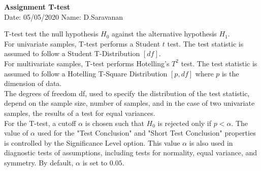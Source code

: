\documentclass[a4paper,11pt,openright]{report}
\begin{document}
\singlespacing
\pagestyle{plain}

\begin{center}
\textbf{Assignment T-test} \\
Date: 05/05/2020 \hspace{2mm} Name: D.Saravanan
\end{center}

\vspace{10px}

T-test test the null hypothesis $H_{0}$ against the alternative hypothesis $H_{1}$. \\

For univariate samples, T-test performs a Student $t$ test. The test statistic is assumed to
follow a Student T-Distribution $[df]$. \\ 

For multivariate samples, T-test performs Hotelling's $T^{2}$ test. The test statistic is
assumed to follow a Hotelling T-Square Distribution $[p,df]$ where $p$ is the dimension of
data. \\

The degrees of freedom df, used to specify the distribution of the test statistic, depend on
the sample size, number of samples, and in the case of two univariate samples, the results 
of a test for equal variances. \\ 

For the T-test, a cutoff $\alpha$ is chosen such that $H_{0}$ is rejected only if $p < 
\alpha$. The value of $\alpha$ used for the "Test Conclusion" and "Short Test Conclusion"
properties is controlled by the Significance Level option. This value $\alpha$ is also used
in diagnostic tests of assumptions, including tests for normality, equal variance, and
symmetry. By default, $\alpha$ is set to $0.05$. \\

\vspace{1cm}
\end{document}
